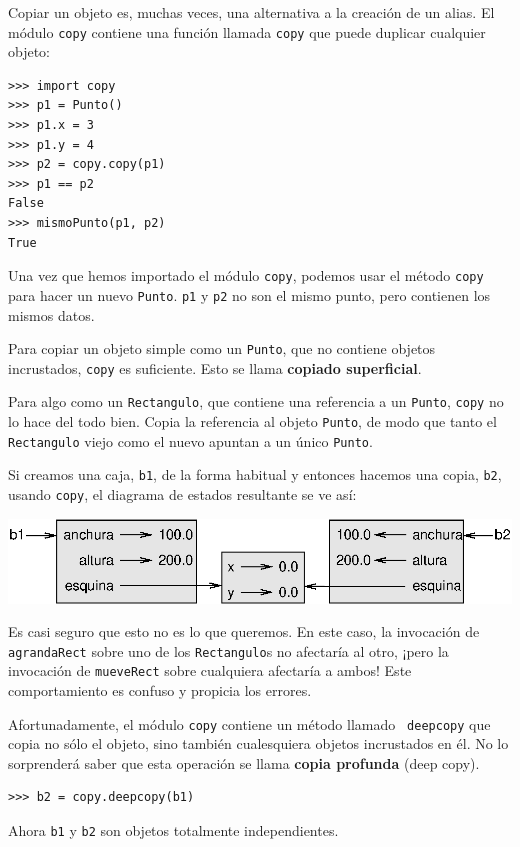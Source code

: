 Copiar un objeto es, muchas veces, una alternativa a la creación de un alias.
El módulo \texttt{copy} contiene una función llamada \texttt{copy} que puede
duplicar cualquier objeto:

\beforeverb
\begin{verbatim}
>>> import copy
>>> p1 = Punto()
>>> p1.x = 3
>>> p1.y = 4
>>> p2 = copy.copy(p1)
>>> p1 == p2
False
>>> mismoPunto(p1, p2)
True
\end{verbatim}
\afterverb
%
Una vez que hemos importado el módulo \texttt{copy}, podemos usar el método \texttt{copy}
para hacer un nuevo \texttt{Punto}.  \texttt{p1} y \texttt{p2} no son el mismo punto, pero
contienen los mismos datos.

Para copiar un objeto simple como un \texttt{Punto}, que no contiene objetos incrustados,
\texttt{copy} es suficiente. Esto se llama {\bf copiado superficial}.

Para algo como un \texttt{Rectangulo}, que contiene una referencia a un 
\texttt{Punto}, \texttt{copy} no lo hace del todo bien. Copia la referencia al objeto
\texttt{Punto}, de modo que tanto el \texttt{Rectangulo} viejo como el nuevo apuntan a
un único \texttt{Punto}.

Si creamos una caja, \texttt{b1}, de la forma habitual y entonces hacemos una
copia, \texttt{b2}, usando \texttt{copy}, el diagrama de estados resultante se ve
así:

\beforefig
\centerline{\includegraphics{illustrations/rectangle2.eps}}
\afterfig

Es casi seguro que esto no es lo que queremos. En este caso, la invocación
de \texttt{agrandaRect} sobre uno de los \texttt{Rectangulo}s no afectaría al otro,
¡pero la invocación de \texttt{mueveRect} sobre cualquiera afectaría a ambos!
Este comportamiento es confuso y propicia los errores.

Afortunadamente, el módulo \texttt{copy} contiene un método llamado {\tt
deepcopy} que copia no sólo el objeto, sino también cualesquiera objetos
incrustados en él. No lo sorprenderá saber que esta operación se llama {\bf
copia profunda} (deep copy).

\beforeverb
\begin{verbatim}
>>> b2 = copy.deepcopy(b1)
\end{verbatim}
\afterverb
%
Ahora \texttt{b1} y \texttt{b2} son objetos totalmente independientes.

